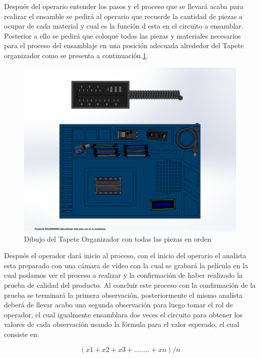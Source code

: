         Después del operario entender los pasos y el proceso que se llevará acaba para realizar el ensamble se pedirá al operario que recuerde la cantidad de piezas a ocupar de cada material y cual es la función d esta en el circuito a ensamblar.
        \\Posterior a ello se pedirá que coloque todas las piezas y materiales necesarios para el proceso del ensamblaje en una posición adecuada alrededor del Tapete organizador como se presenta a continuación.\ref{fig:ensamblaje1}.
    \begin{figure}[H]
        \centering
        \includegraphics[trim = {55mm 15mm 40mm 20mm},clip,scale=0.38]{19/Img/ensamblaje1.pdf}
        \caption{Dibujo del Tapete Organizador con todas las piezas en orden}
        \label{fig:ensamblaje1}
    \end{figure}

        
         Después el operador dará inicio al proceso, con el inicio del operario el analista esta preparado con una cámara de vídeo con la cual se grabará la película en la cual podamos ver el proceso a realizar y la confirmación de haber realizado la prueba de calidad del producto.
        Al concluir este proceso con la confirmación de la prueba se terminará la primera observación, posteriormente el mismo analista deberá de llevar acabo una segunda observación para luego tomar el rol de operador, el cual igualmente ensamblara dos veces el circuito para obtener los valores  de cada observación usando la  fórmula para el valor esperado, el cual consiste en:
    
        \begin{equation}
        \label{eq1}
        (x1+x2+x3+........+xn)/n 
    \end{equation}
    
